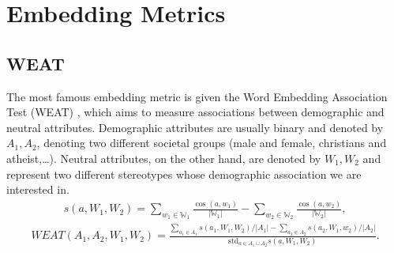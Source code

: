 \documentclass[letterpaper,10pt,english]{sphinxmanual}
\begin{document}
\section{Embedding Metrics}
\label{\detokenize{metrics:embedding-metrics}}

\subsection{WEAT}
\label{\detokenize{metrics:weat}}\label{\detokenize{metrics:id2}}
\sphinxAtStartPar
The most famous embedding metric is given the Word Embedding Association Test (WEAT) ,
which aims to measure associations between demographic and neutral attributes. Demographic attributes are usually binary and denoted by \(A_1, A_2\),
denoting two different societal groups (male and female, christians and atheist,…). Neutral attributes, on the other hand, are denoted by \(W_1, W_2\)
and represent two different stereotypes whose demographic association we are interested in.
\begin{equation*}
\begin{split}s(a, W_1, W_2) = \sum_{w_1\in \mathbb{W}_1} \frac{\cos(a, w_1)}{|\mathbb{W}_1|} - \sum_{w_2\in \mathbb{W}_2} \frac{\cos(a, w_2)}{|\mathbb{W}_2|},\end{split}
\end{equation*}\begin{equation*}
\begin{split}WEAT(A_1, A_2, W_1, W_2) = \frac{\sum_{a_1 \in A_1} s(a_1, W_1, W_2)/ |A_1| - \sum_{a_2 \in A_2} s(a_2, W_1, w_2)/ |A_2| }{\text{std}_{a\in A_1 \cup A_2} s(a, W_1, W_2)}.\end{split}
\end{equation*}
\end{document}
